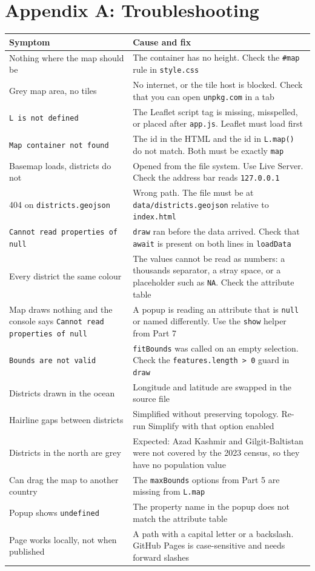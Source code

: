 \documentclass{article}
\newcommand{\cd}[1]{\texttt{#1}}
\begin{document}
\section*{Appendix A: Troubleshooting}

\begin{tabularx}{\textwidth}{@{}L{4.6cm} X@{}}
\toprule
\textbf{Symptom} & \textbf{Cause and fix} \\
\midrule
Nothing where the map should be &
  The container has no height. Check the \cd{\#map} rule in
  \cd{style.css} \\
Grey map area, no tiles &
  No internet, or the tile host is blocked. Check that you can open
  \cd{unpkg.com} in a tab \\
\cd{L is not defined} &
  The Leaflet script tag is missing, misspelled, or placed after
  \cd{app.js}. Leaflet must load first \\
\cd{Map container not found} &
  The id in the HTML and the id in \cd{L.map()} do not match. Both must
  be exactly \cd{map} \\
Basemap loads, districts do not &
  Opened from the file system. Use Live Server. Check the address bar
  reads \cd{127.0.0.1} \\
404 on \cd{districts.geojson} &
  Wrong path. The file must be at \cd{data/districts.geojson} relative
  to \cd{index.html} \\
\cd{Cannot read properties of null} &
  \cd{draw} ran before the data arrived. Check that \cd{await} is
  present on both lines in \cd{loadData} \\
Every district the same colour &
  The values cannot be read as numbers: a thousands separator, a stray
  space, or a placeholder such as \cd{NA}. Check the attribute table \\
Map draws nothing and the console says \cd{Cannot read properties of
  null} &
  A popup is reading an attribute that is \cd{null} or named differently.
  Use the \cd{show} helper from Part 7 \\
\cd{Bounds are not valid} &
  \cd{fitBounds} was called on an empty selection. Check the
  \cd{features.length > 0} guard in \cd{draw} \\
Districts drawn in the ocean &
  Longitude and latitude are swapped in the source file \\
Hairline gaps between districts &
  Simplified without preserving topology. Re-run Simplify with that
  option enabled \\
Districts in the north are grey &
  Expected: Azad Kashmir and Gilgit-Baltistan were not covered by the 2023
  census, so they have no population value \\
Can drag the map to another country &
  The \cd{maxBounds} options from Part 5 are missing from \cd{L.map} \\
Popup shows \cd{undefined} &
  The property name in the popup does not match the attribute table \\
Page works locally, not when published &
  A path with a capital letter or a backslash. GitHub Pages is
  case-sensitive and needs forward slashes \\
\bottomrule
\end{tabularx}
\end{document}
